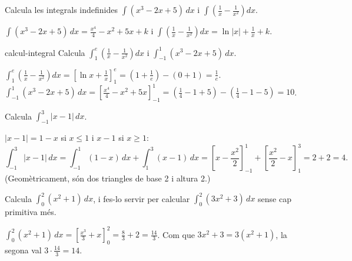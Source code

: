 \begin{apartats}

Calcula les integrals indefinides $\displaystyle\int(x^3-2x+5)\,dx$ i
$\displaystyle\int\left(\frac1x-\frac1{x^2}\right)dx$.

\begin{solucio}
$\displaystyle\int(x^3-2x+5)\,dx=\frac{x^4}4-x^2+5x+k$ i
$\displaystyle\int\left(\frac1x-\frac1{x^2}\right)dx=\ln|x|+\frac1x+k$.
\end{solucio}

\begin{tria}{calcul-integral}
Calcula $\displaystyle\int_1^e\left(\frac1x-\frac1{x^2}\right)dx$ i $\displaystyle\int_{-1}^1(x^3-2x+5)\,dx$.

\begin{solucio}
$\displaystyle\int_1^e\left(\frac1x-\frac1{x^2}\right)dx=\left[\ln x+\frac1x\right]_1^e
=\left(1+\frac1e\right)-(0+1)=\frac1e$.\\
$\displaystyle\int_{-1}^1(x^3-2x+5)\,dx=\left[\frac{x^4}4-x^2+5x\right]_{-1}^1
=\left(\frac14-1+5\right)-\left(\frac14-1-5\right)=10$.
\end{solucio}

Calcula $\displaystyle\int_{-1}^3|x-1|\,dx$.

\begin{solucio}
$|x-1|=1-x$ si $x\le1$ i $x-1$ si $x\ge1$:
\[
\int_{-1}^3|x-1|\,dx=\int_{-1}^1(1-x)\,dx+\int_1^3(x-1)\,dx
=\left[x-\frac{x^2}2\right]_{-1}^1+\left[\frac{x^2}2-x\right]_1^3=2+2=4.
\]
(Geomètricament, són dos triangles de base 2 i altura 2.)
\end{solucio}
\end{tria}

\begin{nomesllarg}
Calcula $\displaystyle\int_0^2(x^2+1)\,dx$, i fes-lo servir per calcular $\displaystyle\int_0^2(3x^2+3)\,dx$
sense cap primitiva més.

\begin{solucio}
$\displaystyle\int_0^2(x^2+1)\,dx=\left[\frac{x^3}3+x\right]_0^2=\frac83+2=\frac{14}3$. Com que
$3x^2+3=3(x^2+1)$, la segona val $3\cdot\frac{14}3=14$.
\end{solucio}
\end{nomesllarg}

\end{apartats}

